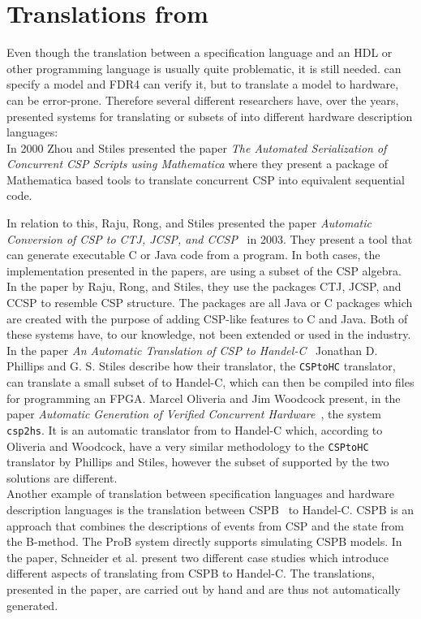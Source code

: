 \section{Translations from \cspm{}}
Even though the translation between a specification language and an HDL or other programming language is usually quite problematic, it is still needed.
\cspm{} can specify a model and FDR4 can verify it, but to translate a model to hardware, can be error-prone. Therefore several different researchers have,  over the years, presented systems for translating \cspm{} or subsets of \cspm{} into different hardware description languages:\\

In 2000 Zhou and Stiles presented the paper \textit{The Automated Serialization of Concurrent CSP Scripts using Mathematica}\cite{Zhou2000} where they present a package of Mathematica based tools to translate concurrent CSP into equivalent sequential code.

In relation to this, Raju, Rong, and Stiles presented the paper \textit{Automatic Conversion of CSP to CTJ, JCSP, and CCSP}~\cite{Raju2003} in 2003. They present a tool that can generate executable C or Java code from a \cspm{} program. In both cases, the implementation presented in the papers, are using a subset of the CSP algebra. In the paper by Raju,
Rong, and Stiles, they use the packages CTJ, JCSP, and CCSP to resemble CSP structure. The packages are all Java or C packages which are created with the purpose of adding CSP-like features to C and Java. Both of these systems have, to our knowledge, not been extended or used in the industry.\\

In the paper \textit{An Automatic Translation of CSP to Handel-C}~\cite{Phillips2004} Jonathan D. Phillips and G. S. Stiles describe how their translator, the \texttt{CSPtoHC} translator, can translate a small subset of \cspm{} to Handel-C\cite{Celoxia2002}, which can then be compiled into files for programming an FPGA.
Marcel Oliveria and Jim Woodcock present, in the paper \textit{Automatic Generation of Verified Concurrent Hardware}~\cite{Oliveira2007}, the system \texttt{csp2hs}. It is an automatic translator from \cspm{} to Handel-C which, according to Oliveria and Woodcock, have a very similar methodology to the \texttt{CSPtoHC} translator by Phillips and Stiles, however the subset of \cspm{} supported by the two solutions are different.\\

Another example of translation between specification languages and hardware description languages is the translation between CSP\textbar\textbar B~\cite{Schneider2002a} to Handel-C. CSP\textbar\textbar B is an approach that combines the descriptions of events from CSP and the state from the B-method. The ProB system\cite{ProB}\cite{Leuschel2003} directly supports simulating CSP\textbar\textbar B models. In the paper,  Schneider et al. present two different case studies which introduce different aspects of translating from CSP\textbar\textbar B to Handel-C. The translations, presented in the paper, are carried out by hand and are thus not automatically generated.\\

